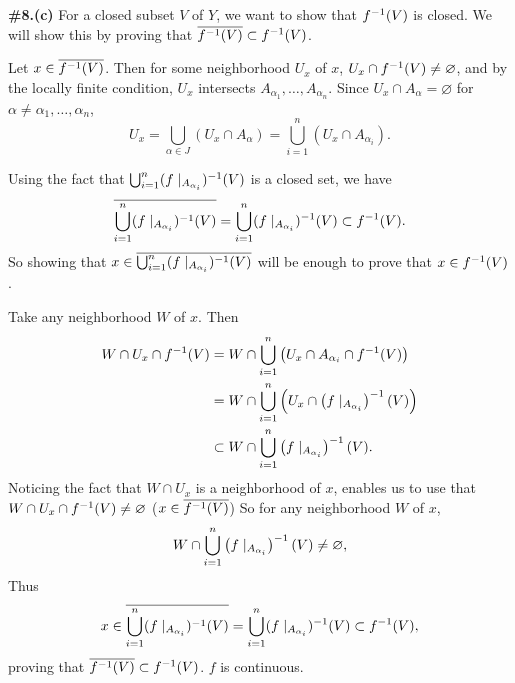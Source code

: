 \documentclass[a4paper,11pt]{article}
\begin{document}
\newpage

\phantom{?}
\vspace{5mm}

\begin{minipage}[t][270mm]{90mm}
    {\bfseries \large \#8.(c)} For a closed subset \(V\) of \(Y\), we want to show that \(f^{-1}(V)\) is closed. We will show this by proving that \(\overline{f^{-1}(V)} \subset f^{-1}(V)\).

    Let \(x \in \overline{f^{-1}(V)}\). Then for some neighborhood \(U_x\) of \(x\), \(U_x \cap f^{-1}(V) \neq \varnothing\), and by the locally finite condition, \(U_x\) intersects \(A_{\alpha_1}, \dots, A_{\alpha_n}\). Since \(U_x \cap A_\alpha = \varnothing\) for \(\alpha \neq \alpha_1, \dots, \alpha_n\),
    \[
        U_x = \bigcup_{\alpha \in J} (U_x\cap A_\alpha) = \bigcup_{i=1}^n (U_x \cap A_{\alpha_i}).
    \]

    Using the fact that \(\bigcup_{i=1}^n (f \mid_{A_{\alpha_i}})^{-1}(V)\) is a closed set, we have
    \[
        \overline{\bigcup_{i=1}^n (f \mid_{A_{\alpha_i}})^{-1}(V)} = \bigcup_{i=1}^n (f \mid_{A_{\alpha_i}})^{-1}(V) \subset f^{-1}(V).
    \]
    So showing that \(x \in \overline{\bigcup_{i=1}^n (f \mid_{A_{\alpha_i}})^{-1}(V)}\) will be enough to prove that \(x \in f^{-1}(V)\).

    \bigskip

    Take any neighborhood \(W\) of \(x\). Then
    \[
        \begin{aligned}
            W \cap U_x \cap f^{-1}(V) & = W \cap \bigcup_{i=1}^n \left( U_x \cap A_{\alpha_i} \cap f^{-1}(V) \right) \\
                                     & = W \cap \bigcup_{i=1}^n \left( U_x \cap \left( f\mid_{A_{\alpha_i}} \right)^{-1}(V) \right) \\
                                     & \subset W \cap \bigcup_{i=1}^n \left( f \mid_{A_{\alpha_i}} \right)^{-1}(V).
        \end{aligned}
    \]
    Noticing the fact that \(W \cap U_x\) is a neighborhood of \(x\), enables us to use that \(W \cap U_x \cap f^{-1}(V) \neq \varnothing\) (\(x \in \overline{f^{-1}(V)}\)) So for any neighborhood \(W\) of \(x\),
    \[
        W \cap \bigcup_{i=1}^n \left( f \mid_{A_{\alpha_i}} \right)^{-1}(V) \neq \varnothing,
    \]
    Thus
    \[
        \begin{aligned}
            x \in \overline{\bigcup_{i=1}^n (f \mid_{A_{\alpha_i}})^{-1}(V)} = \bigcup_{i=1}^n (f \mid_{A_{\alpha_i}})^{-1}(V) \subset f^{-1}(V),
        \end{aligned}
    \]
    proving that \(\overline{f^{-1}(V)} \subset f^{-1}(V)\). \(f\) is continuous.
\end{minipage}
{\color{gray}\vline}
\begin{minipage}[t][270mm]{90mm}
    \phantom{?}
\end{minipage}
\end{document}
